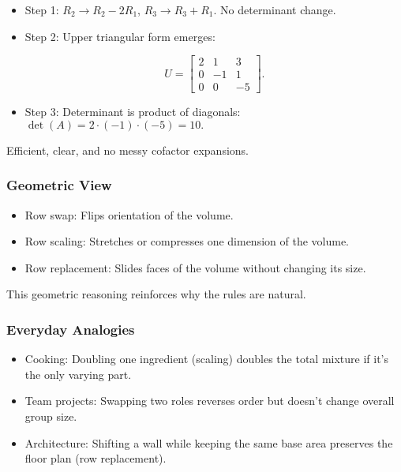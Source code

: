\documentclass[
  letterpaper,
  DIV=11,
  numbers=noendperiod]{scrreprt}
\providecommand{\tightlist}{%
  \setlength{\itemsep}{0pt}\setlength{\parskip}{0pt}}
\begin{document}
\begin{itemize}
\item
  Step 1: \(R_2 \to R_2 - 2R_1\), \(R_3 \to R_3 + R_1\). No determinant
  change.
\item
  Step 2: Upper triangular form emerges:

  \[
  U = \begin{bmatrix} 2 & 1 & 3 \\ 0 & -1 & 1 \\ 0 & 0 & -5 \end{bmatrix}.
  \]
\item
  Step 3: Determinant is product of diagonals:
  \(\det(A) = 2 \cdot (-1) \cdot (-5) = 10.\)
\end{itemize}

Efficient, clear, and no messy cofactor expansions.

\subsubsection{Geometric View}\label{geometric-view}

\begin{itemize}
\tightlist
\item
  Row swap: Flips orientation of the volume.
\item
  Row scaling: Stretches or compresses one dimension of the volume.
\item
  Row replacement: Slides faces of the volume without changing its size.
\end{itemize}

This geometric reasoning reinforces why the rules are natural.

\subsubsection{Everyday Analogies}\label{everyday-analogies-49}

\begin{itemize}
\tightlist
\item
  Cooking: Doubling one ingredient (scaling) doubles the total mixture
  if it's the only varying part.
\item
  Team projects: Swapping two roles reverses order but doesn't change
  overall group size.
\item
  Architecture: Shifting a wall while keeping the same base area
  preserves the floor plan (row replacement).
\end{itemize}
\end{document}
